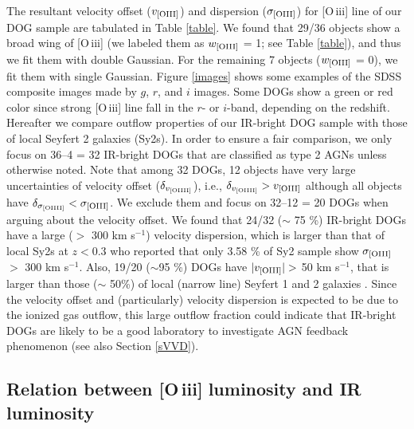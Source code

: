 \documentclass[twocolumn]{aastex6}
\newcommand{\oiii}{[O{\,\sc iii}]\,\,}
\begin{document}
The resultant velocity offset ($v_{\rm [OIII]}$) and dispersion ($\sigma_{\rm [OIII]}$) for \oiii line of our DOG sample are tabulated in Table \ref{table}.
We found that 29/36 objects show a broad wing of [O{\,\sc iii}] (we labeled them as $w_{\rm [OIII]}$ = 1; see Table \ref{table}), and thus we fit them with double Gaussian.
For the remaining 7 objects ($w_{\rm [OIII]}$ = 0), we fit them with single Gaussian. 
Figure \ref{images} shows some examples of the SDSS composite images made by $g$, $r$, and $i$ images.  
Some DOGs show a green or red color since strong \oiii line fall in the $r$- or $i$-band, depending on the redshift.\\

Hereafter we compare outflow properties of our IR-bright DOG sample with those of local Seyfert 2 galaxies (Sy2s).
In order to ensure a fair comparison, we only focus on 36--4 = 32 IR-bright DOGs that are classified as type 2 AGNs unless otherwise noted.
Note that among 32 DOGs, 12 objects have very large uncertainties of velocity offset ($\delta_{v_{\rm [OIIII]}}$), i.e., $\delta_{v_{\rm [OIIII]}} > v_{\rm [OIII]}$ although all objects have $\delta_{\sigma_{\rm [OIIII]}} < \sigma_{\rm [OIII]}$.
We exclude them and focus on 32--12 = 20 DOGs when arguing about the velocity offset.
We found that 24/32 ($\sim$ 75 \%) IR-bright DOGs have a large ($>$ 300 km s$^{-1}$) velocity dispersion, which is larger than that of local Sy2s at $z < 0.3$ \citep{Woo} who reported that only 3.58 \% of Sy2 sample show $\sigma_{\rm [OIII]}$ $>$ 300 km s$^{-1}$. 
Also, 19/20 ($\sim$95 \%) DOGs have $|v_{\rm [OIII]}| >$ 50 km s$^{-1}$, that is larger than those ($\sim$ 50\%) of local (narrow line) Seyfert 1 and 2 galaxies \citep[e.g.,][]{Komossa,Zhang_K,Bae}.
Since the velocity offset and (particularly) velocity dispersion is expected to be due to the ionized gas outflow, this large outflow fraction could indicate that IR-bright DOGs are likely to be a good laboratory to investigate AGN feedback phenomenon (see also Section \ref{sVVD}). 


\subsection{Relation between \oiii luminosity and IR luminosity}
\label{LL}
\end{document}
